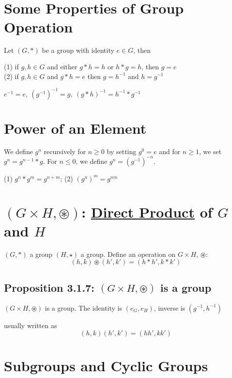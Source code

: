 \documentclass[11pt]{elegantbook}
\begin{document}
\section{Some Properties of Group Operation}
\begin{proposition}[Proposition 3.1.1]
    Let $(G,*)$ be a group with identity $e\in G$, then
\end{proposition}
(1) if $g,h\in G$ and either $g*h=h$ or $h*g=h$, then $g=e$\\
(2) if $g,h\in G$ and $g*h=e$ then $g=h^{-1}$ and $h=g^{-1}$

\begin{corollary}[Corollary 3.1.2]
    $e^{-1}=e,\ (g^{-1})^{-1}=g,\ (g*h)^{-1}=h^{-1}*g^{-1}$
\end{corollary}


\section{Power of an Element}
We define $g^n$ recursively for $n \geq 0$ by setting $g^0 = e$ and for $n\geq 1$, we set $g^n = g^{n-1} * g$. For $n \leq 0$, we define $g^n = (g^{-1})^{-n}$.
\begin{proposition}[Proposition 3.1.5]
(1) $g^n*g^m=g^{n+m}$; (2) $(g^n)^m=g^{nm}$
\end{proposition}

\section{$(G\times H, \circledast)$: \underline{Direct Product} of $G$ and $H$}
$(G,*)$ a group $(H,\star)$ a group. Define an operation on $G\times H$, $\circledast$:\\
$$(h,k)\circledast(h',k')=(h*h',k*k')$$
\subsection{Proposition 3.1.7: $(G\times H, \circledast)$ is a group}
\begin{proposition}[Proposition 3.1.7]
$(G\times H, \circledast)$ is a group. The identity is $(e_G,e_H)$, inverse is $(g^{-1},h^{-1})$
\end{proposition}
usually written as
$$(h,k)(h',k')=(hh',kk')$$

\section{Subgroups and Cyclic Groups}
\end{document}
